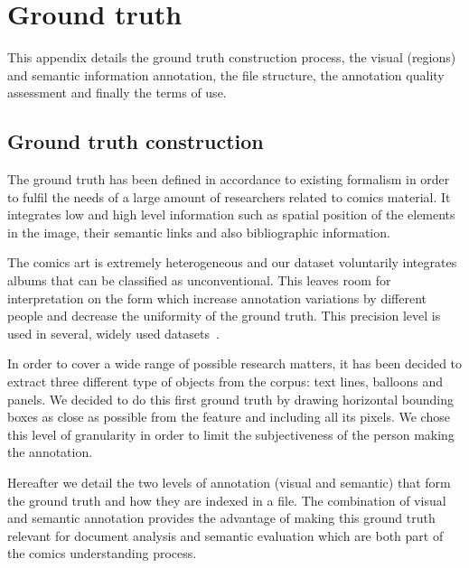 \chapter{Ground truth}
\label{app:groundtruth}
\graphicspath{{./chapters/Appendix/figs/}}

This appendix details the ground truth construction process, the visual (regions) and semantic information annotation, the file structure, the annotation quality assessment and finally the terms of use.


\section{Ground truth construction} %
\label{sec:ground_truth_construction}

The ground truth has been defined in accordance to existing formalism in order to fulfil the needs of a large amount of researchers related to comics material.
It integrates low and high level information such as spatial position of the elements in the image, their semantic links and also bibliographic information.


The comics art is extremely heterogeneous and our dataset voluntarily integrates albums that can be classified as
unconventional.
This leaves room for interpretation on the form which increase annotation variations by different people and decrease the uniformity of the ground truth.
This precision level is used in several, widely used datasets~\cite{pascal-voc-2012, yao2007introduction}.

In order to cover a wide range of possible research matters, it has been decided to extract three different type of objects from the corpus: text lines, balloons and panels.
We decided to do this first ground truth by drawing horizontal bounding boxes as close as possible from the feature and including all its pixels.
We chose this level of granularity in order to limit the subjectiveness of the person making the annotation.

Hereafter we detail the two levels of annotation (visual and semantic) that form the ground truth and how they are indexed in a file.
The combination of visual and semantic annotation provides the advantage of making this ground truth relevant for document analysis and semantic evaluation which are both part of the comics understanding process.

